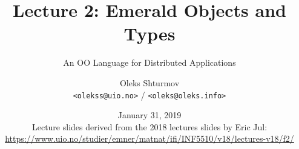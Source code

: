 \documentclass[xcolor=table]{beamer}
\title{{\Large Lecture 2: Emerald Objects and Types}}
\subtitle{An OO Language for Distributed Applications}
\institute{University of Oslo}
\author{Oleks Shturmov\\[-0.2em]%
  {\tiny \texttt{<olekss@uio.no>} / \texttt{<oleks@oleks.info>}}
}
\date{January 31, 2019\\[2em]
{\scriptsize Lecture slides derived from the 2018 lectures slides by
Eric Jul: \\
{\tiny \url{https://www.uio.no/studier/emner/matnat/ifi/INF5510/v18/lectures-v18/f2/}}}}
\begin{document}
\begin{frame} \titlepage \end{frame}


















\end{document}
